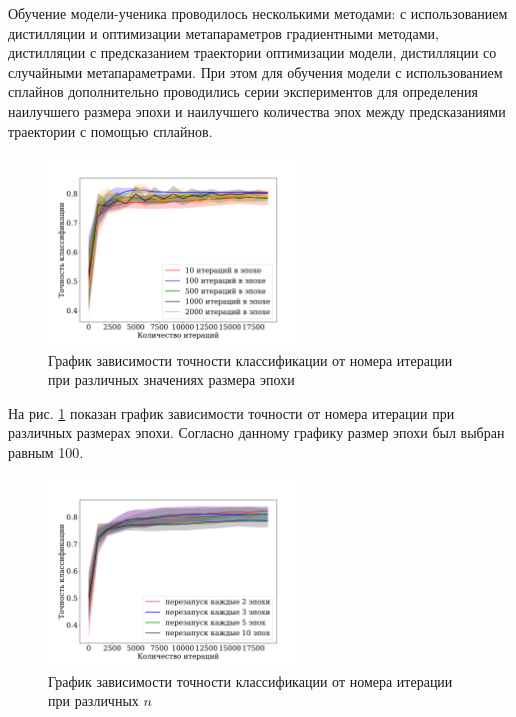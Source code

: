 \documentclass[12pt, twoside]{article}
\begin{document}
Обучение модели-ученика проводилось несколькими методами: с использованием дистилляции и оптимизации метапараметров градиентными методами, дистилляции с предсказанием траектории оптимизации модели, дистилляции со случайными метапараметрами. При этом для обучения модели с использованием сплайнов дополнительно проводились серии экспериментов для определения наилучшего размера эпохи и наилучшего количества эпох между предсказаниями траектории с помощью сплайнов.

\begin{figure}[!ht]
    \centering
    \includegraphics[width=0.6\textwidth]{linear_epoch_size.pdf}
    \caption{График зависимости точности классификации от номера итерации при различных значениях размера эпохи}
    \label{fig:epoch_size}
\end{figure}

На рис. \ref{fig:epoch_size} показан график зависимости точности от номера итерации при различных размерах эпохи. Согласно данному  графику размер эпохи был выбран равным 100.

\begin{figure}[!ht]
    \centering
    \includegraphics[width=0.6\textwidth]{linear_train_splines_every_epoch.pdf}
    \caption{График зависимости точности классификации от номера итерации при различных $n$}
    \label{fig:train_splines_every_epoch}
\end{figure}
\end{document}
